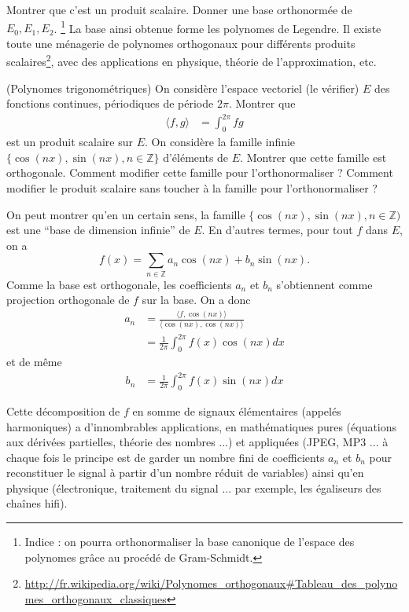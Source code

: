 \documentclass[10pt,a4paper]{article}
\newcommand{\Z}{\mathbb{Z}}
\newcounter{numeroexo}
\newcommand{\exercice}{\medskip\par\noindent\stepcounter{numeroexo}
	\hspace{-.25cm}\fbox{\textbf{Exercice \arabic{numeroexo}}}\quad}
\begin{document}
Montrer que c'est un produit scalaire. Donner une base orthonormée de
$E_0, E_1, E_2$. \footnote{Indice : on pourra orthonormaliser la base canonique
de l'espace des polynomes grâce au procédé de Gram-Schmidt.} La base
ainsi obtenue forme les polynomes de Legendre. Il existe toute une
ménagerie de polynomes orthogonaux pour différents produits
scalaires\footnote{\url{http://fr.wikipedia.org/wiki/Polynomes_orthogonaux#Tableau_des_polynomes_orthogonaux_classiques}},
avec des applications en physique, théorie de l'approximation, etc.


\exercice (Polynomes trigonométriques) On considère l'espace vectoriel
(le vérifier) $E$ des fonctions continues, périodiques de période
$2\pi$. Montrer que
\begin{align*}
  \langle f,g \rangle &= \int_0^{2\pi} f g
\end{align*}
est un produit scalaire sur $E$. On considère la famille infinie
$\{\cos(nx), \sin(nx), n \in \Z\}$ d'éléments de $E$. Montrer que
cette famille est orthogonale. Comment modifier cette famille pour
l'orthonormaliser ? Comment modifier le produit scalaire sans toucher
à la famille pour l'orthonormaliser ?

On peut montrer qu'en un certain sens, la famille $\{\cos(nx),
\sin(nx), n \in \Z)$ est une ``base de dimension infinie'' de $E$. En
d'autres termes, pour tout $f$ dans $E$, on a
\begin{equation*}
  f(x) = \sum_{n \in \Z} a_n \cos(nx) + b_n \sin(nx).
\end{equation*}
Comme la base est orthogonale, les coefficients $a_n$ et $b_n$
s'obtiennent comme projection orthogonale de $f$ sur la base. On a
donc
\begin{align*}
  a_n &= \frac{\langle f, \cos(nx) \rangle}{\langle \cos(nx), \cos(nx)
  \rangle}\\
&= \frac 1 {2\pi} \int_0^{2\pi} f(x) \cos(nx) dx
\end{align*}
et de même
\begin{align*}
  b_n &= \frac 1 {2\pi} \int_0^{2\pi} f(x) \sin(nx) dx
\end{align*}

Cette décomposition de $f$ en somme de signaux élémentaires (appelés
harmoniques) a d'innombrables applications, en mathématiques pures
(équations aux dérivées partielles, théorie des nombres ...) et
appliquées (JPEG, MP3 ... à chaque fois le principe est de garder un
nombre fini de coefficients $a_n$ et $b_n$ pour reconstituer le signal
à partir d'un nombre réduit de variables) ainsi qu'en physique
(électronique, traitement du signal ... par exemple, les égaliseurs
des chaînes hifi).
\end{document}
